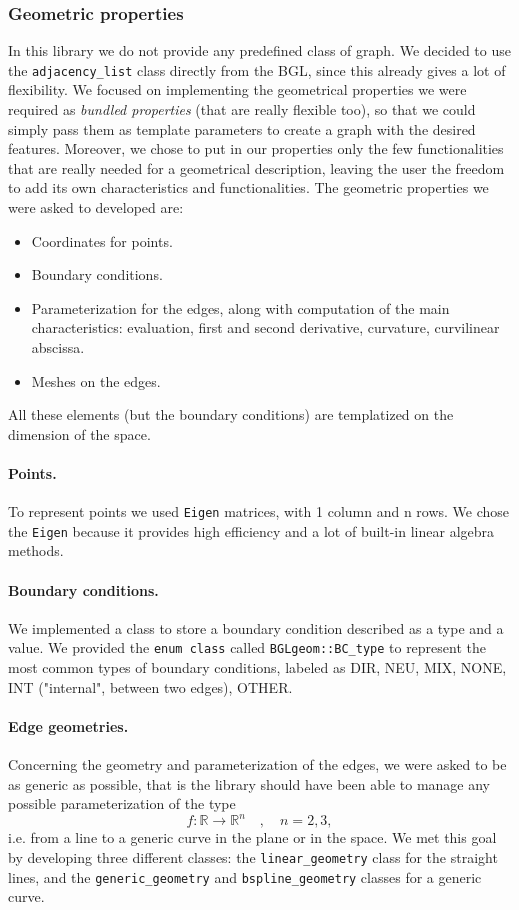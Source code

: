 \documentclass[10pt]{article} %
\newcommand{\classname}[1]{\texttt{#1}}
\begin{document}
	\subsubsection{Geometric properties}
	In this library we do not provide any predefined class of graph. We decided to use the \classname{adjacency\_list} class directly from the BGL, since this already gives a lot of flexibility. We focused on implementing the geometrical properties we were required as \textit{bundled properties} (that are really flexible too), so that we could simply pass them as template parameters to create a graph with the desired features. Moreover, we chose to put in our properties only the few functionalities that are really needed for a geometrical description, leaving the user the freedom to add its own characteristics and functionalities. \newline
	The geometric properties we were asked to developed are:
	\begin{itemize}
		\item Coordinates for points.
		\item Boundary conditions.
		\item Parameterization for the edges, along with computation of the main characteristics: evaluation, first and second derivative, curvature, curvilinear abscissa.
		\item Meshes on the edges.
	\end{itemize}
	All these elements (but the boundary conditions) are templatized on the dimension of the space.				
	\paragraph{Points.}	To represent points we used \texttt{Eigen} matrices, with 1 column and n rows. We chose the \texttt{Eigen} because it provides high efficiency and a lot of built-in linear algebra methods.
	\paragraph{Boundary conditions.} We implemented a class to store a boundary condition described as a type and a value. We provided the \texttt{enum class} called \texttt{BGLgeom::BC\_type} to represent the most common types of boundary conditions, labeled as DIR, NEU, MIX, NONE, INT ("internal", between two edges), OTHER.
	\paragraph{Edge geometries.} Concerning the geometry and parameterization of the edges, we were asked to be as generic as possible, that is the library should have been able to manage any possible parameterization of the type
	\begin{equation*}
	f:\mathbb{R}\rightarrow\mathbb{R}^{n} \quad, \quad n=2,3 ,
	\end{equation*}
	i.e. from a line to a generic curve in the plane or in the space. We met this goal by developing three different classes: the \classname{linear\_geometry} class for the straight lines, and the \classname{generic\_geometry} and \classname{bspline\_geometry} classes for a generic curve.
\end{document}
